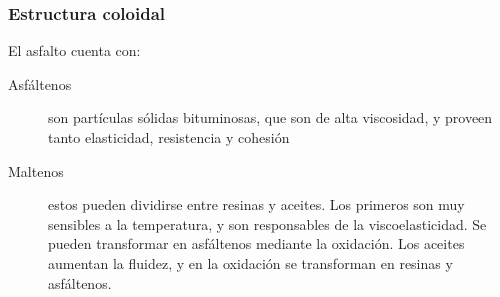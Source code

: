 \documentclass[../main.tex]{subfiles}
\begin{document}
\subsubsection{Estructura coloidal}

El asfalto cuenta con:

\begin{description}
  \item[Asfáltenos] son partículas sólidas bituminosas, que son de alta
    viscosidad, y proveen tanto elasticidad, resistencia y cohesión
  \item[Maltenos] estos pueden dividirse entre resinas y aceites. Los primeros
    son muy sensibles a la temperatura, y son responsables de la 
    viscoelasticidad. Se pueden transformar en asfáltenos mediante la oxidación.
    Los aceites aumentan la fluidez, y en la oxidación se transforman en 
    resinas y asfáltenos.
\end{description}
\end{document}
